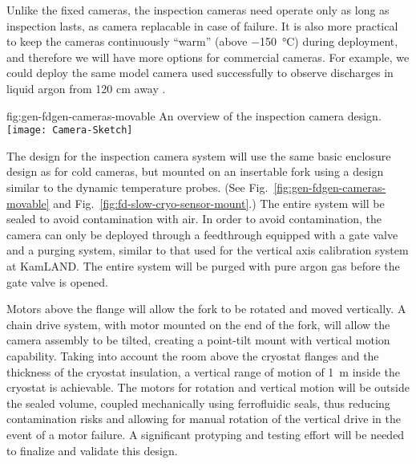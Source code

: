 Unlike the fixed cameras, the inspection cameras need operate only as
long as inspection lasts, as camera replacable in case of failure.  It
is also more practical to keep the cameras continuously ``warm''
(above \SI{-150}{\celsius}) during deployment, and therefore we will
have more options for commercial cameras.  For example, we could
deploy the same model camera used successfully to observe discharges
in liquid argon from 120 cm away \cite{Auger:2015xlo}.

\begin{dunefigure}{fig:gen-fdgen-cameras-movable}
  {An overview of the inspection camera design.}
  \texttt{[image: Camera-Sketch]}%
\end{dunefigure}

The design for the inspection camera system will use the same basic
enclosure design as for cold cameras, but mounted on an insertable
fork using a design similar to the dynamic temperature probes. (See
Fig.\ \ref{fig:gen-fdgen-cameras-movable} and
Fig.\ \ref{fig:fd-slow-cryo-sensor-mount}.)  The entire system will be sealed to
avoid contamination with air. In order to avoid contamination, the
camera can only be deployed through a feedthrough equipped with a gate
valve and a purging system, similar to that used for the vertical axis
calibration system at KamLAND\cite{Banks:2014hra}. The entire system
will be purged with pure argon gas before the gate valve is opened.

Motors above the flange will allow the fork to be
rotated and moved vertically.  A chain drive system, with motor
mounted on the end of the fork, will allow the camera assembly to be
tilted, creating a point-tilt mount with vertical motion capability.
Taking into account the room above the cryostat flanges and the
thickness of the cryostat insulation, a vertical range of motion of
\SI{1}{m} inside the cryostat is achievable.
The motors for rotation and vertical motion will be outside the sealed
volume, coupled mechanically using ferrofluidic seals, thus reducing
contamination risks and allowing for manual rotation of the vertical
drive in the event of a motor failure.  A significant protyping and
testing effort will be needed to finalize and validate this design.

